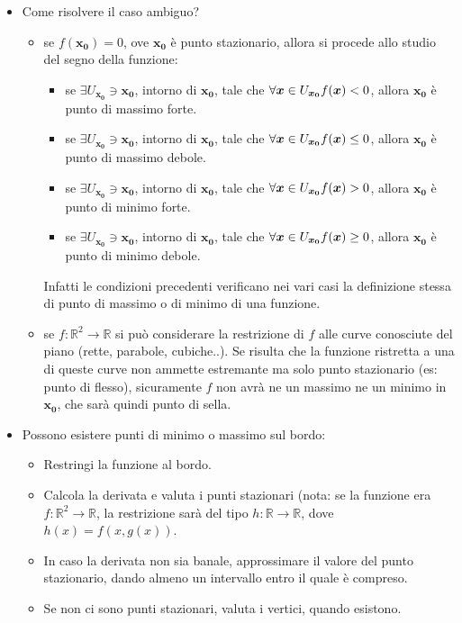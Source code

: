 \documentclass[a4paper,12pt]{book}
\begin{document}
\begin{itemize}
\begin{itemize}
\end{itemize}
\item Come risolvere il caso ambiguo?
\begin{itemize}
\item se $f(\boldsymbol {x_0})=0$, ove $\boldsymbol {x_0}$ è punto stazionario, allora si procede allo studio del segno della funzione:
\begin{itemize}
\item se $\exists U_{\boldsymbol {x_0}}\ni\boldsymbol {x_0}$, intorno di $\boldsymbol {x_0}$, tale che $\forall \boldsymbol{x}\in U_{\boldsymbol {x_0}}\\f(\boldsymbol{x})<0$, allora $\boldsymbol {x_0}$ è punto di massimo forte.
\item se $\exists U_{\boldsymbol {x_0}}\ni\boldsymbol {x_0}$, intorno di $\boldsymbol {x_0}$, tale che $\forall \boldsymbol{x}\in U_{\boldsymbol {x_0}}\\f(\boldsymbol{x})\leq0$, allora $\boldsymbol {x_0}$ è punto di massimo debole.
\item se $\exists U_{\boldsymbol {x_0}}\ni\boldsymbol {x_0}$, intorno di $\boldsymbol {x_0}$, tale che $\forall \boldsymbol{x}\in U_{\boldsymbol {x_0}}\\f(\boldsymbol{x})>0$, allora $\boldsymbol {x_0}$ è punto di minimo forte.
\item se $\exists U_{\boldsymbol {x_0}}\ni\boldsymbol {x_0}$, intorno di $\boldsymbol {x_0}$, tale che $\forall \boldsymbol{x}\in U_{\boldsymbol {x_0}}\\f(\boldsymbol{x})\geq0$, allora $\boldsymbol {x_0}$ è punto di minimo debole.
\end{itemize}
Infatti le condizioni precedenti verificano nei vari casi la definizione stessa di punto di massimo o di minimo di una funzione.
\item se $f:\mathbb{R}^2\to\mathbb{R}$ si può considerare la restrizione di $f$ alle curve conosciute del piano (rette, parabole, cubiche..). Se risulta che la funzione ristretta a una di queste curve non ammette estremante ma solo punto stazionario (es: punto di flesso), sicuramente $f$ non avrà ne un massimo ne un minimo in $\boldsymbol {x_0}$, che sarà quindi punto di sella.
\end{itemize}
\item Possono esistere punti di minimo o massimo sul bordo:
\begin{itemize}
 \item Restringi la funzione al bordo.
 \item Calcola la derivata e valuta i punti stazionari (nota: se la funzione era $f: \mathbb{R}^2 \rightarrow \mathbb{R}$, la restrizione sarà del tipo $h: \mathbb{R} \rightarrow \mathbb{R}$, dove $h(x) = f(x, g(x))$.
 \item In caso la derivata non sia banale, approssimare il valore del punto stazionario, dando almeno un intervallo entro il quale è compreso.
 \item Se non ci sono punti stazionari, valuta i vertici, quando esistono.
\end{itemize}
\end{itemize}
\end{document}
